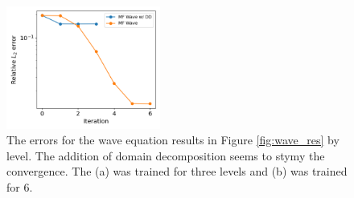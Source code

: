 \documentclass[12pt]{article}
\begin{document}
\begin{figure}[H]
\centering
\includegraphics[width=0.45\textwidth]{imgs/wave_errors}
\caption{The errors for the wave equation results in Figure \ref{fig:wave_res} by level. The addition of domain decomposition seems to stymy the convergence. The (a) was trained for three levels and (b) was trained for 6.}
\end{figure}
\end{document}
